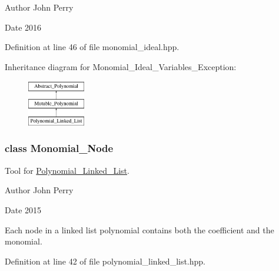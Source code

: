 \begin{DoxyAuthor}{Author}
John Perry 
\end{DoxyAuthor}
\begin{DoxyDate}{Date}
2016 
\end{DoxyDate}


Definition at line 46 of file monomial\+\_\+ideal.\+hpp.

Inheritance diagram for Monomial\+\_\+\+Ideal\+\_\+\+Variables\+\_\+\+Exception\+:\begin{figure}[H]
\begin{center}
\leavevmode
\includegraphics[height=2.000000cm]{group__polygroup}
\end{center}
\end{figure}
\label{class_monomial___node}
\subsubsection{class Monomial\+\_\+\+Node}
Tool for \hyperlink{group__polygroup_class_polynomial___linked___list}{Polynomial\+\_\+\+Linked\+\_\+\+List}. 

\begin{DoxyAuthor}{Author}
John Perry 
\end{DoxyAuthor}
\begin{DoxyDate}{Date}
2015
\end{DoxyDate}
Each node in a linked list polynomial contains both the coefficient and the monomial. 

Definition at line 42 of file polynomial\+\_\+linked\+\_\+list.\+hpp.


